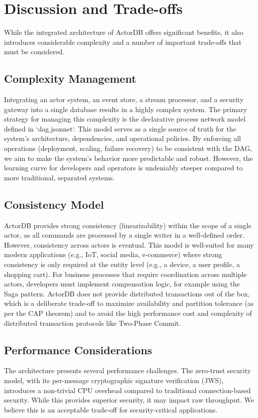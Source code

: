\documentclass{article}
\begin{document}
\section{Discussion and Trade-offs}
While the integrated architecture of ActorDB offers significant benefits, it also introduces considerable complexity and a number of important trade-offs that must be considered.

\subsection{Complexity Management}
Integrating an actor system, an event store, a stream processor, and a security gateway into a single database results in a highly complex system. The primary strategy for managing this complexity is the declarative process network model defined in `dag.jsonnet`. This model serves as a single source of truth for the system's architecture, dependencies, and operational policies. By enforcing all operations (deployment, scaling, failure recovery) to be consistent with the DAG, we aim to make the system's behavior more predictable and robust. However, the learning curve for developers and operators is undeniably steeper compared to more traditional, separated systems.

\subsection{Consistency Model}
ActorDB provides strong consistency (linearizability) within the scope of a single actor, as all commands are processed by a single writer in a well-defined order. However, consistency across actors is eventual. This model is well-suited for many modern applications (e.g., IoT, social media, e-commerce) where strong consistency is only required at the entity level (e.g., a device, a user profile, a shopping cart). For business processes that require coordination across multiple actors, developers must implement compensation logic, for example using the Saga pattern. ActorDB does not provide distributed transactions out of the box, which is a deliberate trade-off to maximize availability and partition tolerance (as per the CAP theorem) and to avoid the high performance cost and complexity of distributed transaction protocols like Two-Phase Commit.

\subsection{Performance Considerations}
The architecture presents several performance challenges. The zero-trust security model, with its per-message cryptographic signature verification (JWS), introduces a non-trivial CPU overhead compared to traditional connection-based security. While this provides superior security, it may impact raw throughput. We believe this is an acceptable trade-off for security-critical applications.
\end{document}
